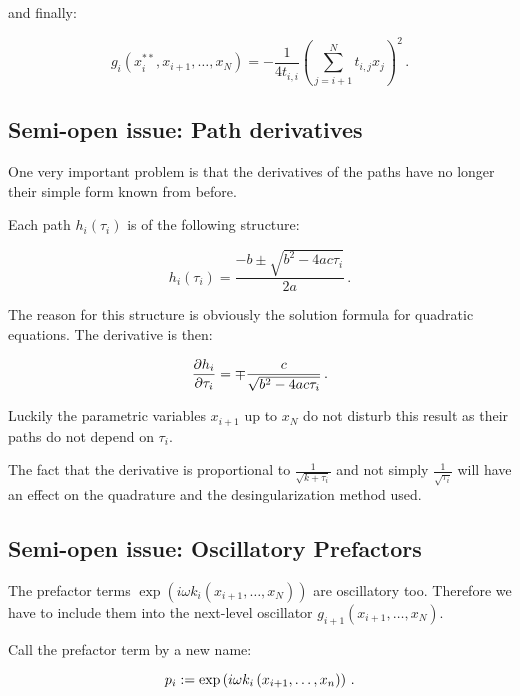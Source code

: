 \documentclass[a4paper,10pt]{article}
\begin{document}
and finally:

\begin{equation} \label{eq:general_ki}
  g_i(x_i^{**}, x_{i+1}, \ldots, x_N) = - \frac{1}{4 t_{i,i}} \left( \sum_{j=i+1}^{N} t_{i,j} x_j \right)^2 \,.
\end{equation}


\subsection{Semi-open issue: Path derivatives}

One very important problem is that the derivatives of the paths
have no longer their simple form known from before.

Each path $h_i\left(\tau_i\right)$ is of the following structure:

\begin{equation}
  h_i\left(\tau_i\right) = \frac{-b \pm \sqrt{b^2 - 4 a c \tau_i}}{2 a} \,.
\end{equation}

The reason for this structure is obviously the solution formula
for quadratic equations. The derivative is then:

\begin{equation}
 \frac{\partial h_i}{\partial \tau_i} = \mp \frac{c}{\sqrt{b^2 - 4 a c \tau_i}} \,.
\end{equation}

Luckily the parametric variables $x_{i+1}$ up to $x_N$ do not
disturb this result as their paths do not depend on $\tau_i$.

The fact that the derivative is proportional to $\frac{1}{\sqrt{k+\tau_i}}$
and not simply $\frac{1}{\sqrt{\tau_i}}$ will have an effect on the
quadrature and the desingularization method used.



\subsection{Semi-open issue: Oscillatory Prefactors}

The prefactor terms $\exp\left(i\omega k_i\left(x_{i+1},\ldots,x_N\right)\right)$
are oscillatory too. Therefore we have to include them into the next-level
oscillator $g_{i+1}\left(x_{i+1},\ldots,x_N\right)$.

Call the prefactor term by a new name:

\begin{equation}
  p_i := \exp\left( i \omega k_i\left(x_{i+1}, \ldots, x_n\right)\right) \,.
\end{equation}
\end{document}
